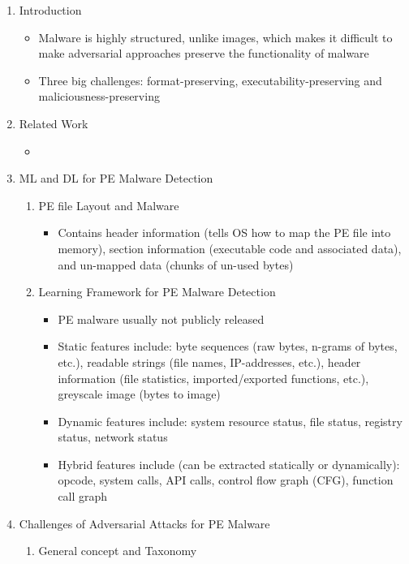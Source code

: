 \documentclass{article}
\begin{document}
\begin{enumerate}
	\item Introduction
	\begin{itemize}
		\item Malware is highly structured, unlike images, which makes it difficult to make adversarial approaches preserve the functionality of malware
		\item Three big challenges: format-preserving, executability-preserving and maliciousness-preserving
	\end{itemize}
	\item Related Work
	\begin{itemize}
		\item 
	\end{itemize}
	\item ML and DL for PE Malware Detection
	\begin{enumerate}
		\item PE file Layout and Malware
		\begin{itemize}
			\item Contains header information (tells OS how to map the PE file into memory), section information (executable code and associated data), and un-mapped data (chunks of un-used bytes)
		\end{itemize}
		\item Learning Framework for PE Malware Detection
		\begin{itemize}
			\item PE malware usually not publicly released
			\item Static features include: byte sequences (raw bytes, n-grams of bytes, etc.), readable strings (file names, IP-addresses, etc.), header information (file statistics, imported/exported functions, etc.), greyscale image (bytes to image)
			\item Dynamic features include: system resource status, file status, registry status, network status
			\item Hybrid features include (can be extracted statically or dynamically): opcode, system calls, API calls, control flow graph (CFG), function call graph 
		\end{itemize}
	\end{enumerate}
	\item Challenges of Adversarial Attacks for PE Malware
	\begin{enumerate}
		\item General concept and Taxonomy
		\begin{itemize}

\end{itemize}
\end{enumerate}
\end{enumerate}
\end{document}
